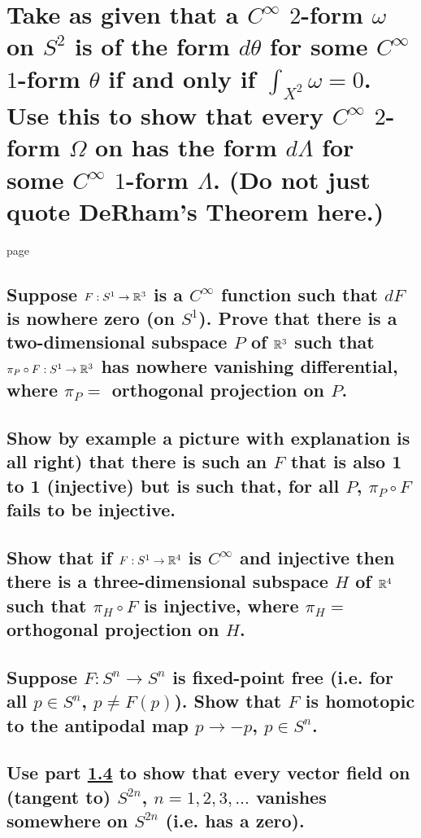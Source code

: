 \documentclass[10pt]{article}
\begin{document}
\section{Take as given that a $C^\infty$ $2$-form $\omega$ on $S^2$ is of the form $d \theta$ for
  some $C^\infty$ $1$-form $\theta$ if and only if $\int_{X^2} \omega =0$. Use this to show that
  every $C^\infty$ $2$-form $\Omega$ on  has the form $d \Lambda $ for some
  $C^\infty$ $1$-form $\Lambda$. (Do not just quote DeRham's Theorem here.)}

page

\advsection{}

\subsection{Suppose $F: S^1 \to \mathbb{R}^3$ is a $C^\infty$ function such that $dF$ is nowhere
  zero (on $S^1$). Prove that there is a two-dimensional subspace $P$ of $\mathbb{R} ^3$ such that
  $\pi_P \circ F : S^1 \to \mathbb{R}^3$ has nowhere vanishing differential, where $\pi_P =$
  orthogonal projection on $P$.}

\subsection{Show by example a picture with explanation is all right) that there is such an
  $F$ that is also 1 to 1 (injective) but is such that, for all $P$, $\pi_P \circ F$ fails to be
  injective.}

\subsection{Show that if $F: S^1 \to \mathbb{R}^4$ is $C^\infty$ and injective then there is a
  three-dimensional subspace $H$ of $\mathbb{R}^4$ such that $\pi_H \circ F $ is injective, where
  $\pi_H =$ orthogonal projection on $H$.}

\advsection{}

\subsection{Suppose $F:S^n \to S^n$ is fixed-point free (i.e. for all $ p \in S^n$, $p \neq
  F(p)$). Show that $F$ is homotopic to the antipodal map $p \to -p$, $p \in S^n$.}
\label{antip}

\subsection{Use part \ref{antip} to show that every vector field on (tangent to) $S^{2n}$,
  $n=1,2,3,\dots$ vanishes somewhere on $S^{2n}$ (i.e. has a zero).}
\end{document}
